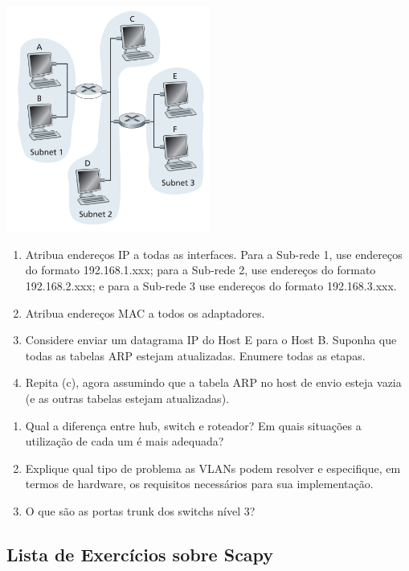 \includegraphics[width=0.5\textwidth,height=\textheight]{Figuras/fig3.png}

\begin{enumerate}
\def\labelenumi{\alph{enumi}.}
\tightlist
\item
  Atribua endereços IP a todas as interfaces. Para a Sub-rede 1, use
  endereços do formato 192.168.1.xxx; para a Sub-rede 2, use endereços
  do formato 192.168.2.xxx; e para a Sub-rede 3 use endereços do formato
  192.168.3.xxx.
\item
  Atribua endereços MAC a todos os adaptadores.
\item
  Considere enviar um datagrama IP do Host E para o Host B. Suponha que
  todas as tabelas ARP estejam atualizadas. Enumere todas as etapas.
\item
  Repita (c), agora assumindo que a tabela ARP no host de envio esteja
  vazia (e as outras tabelas estejam atualizadas).
\end{enumerate}

\begin{enumerate}
\def\labelenumi{\arabic{enumi}.}
\setcounter{enumi}{7}
\item
  Qual a diferença entre hub, switch e roteador? Em quais situações a
  utilização de cada um é mais adequada?
\item
  Explique qual tipo de problema as VLANs podem resolver e especifique,
  em termos de hardware, os requisitos necessários para sua
  implementação.
\item
  O que são as portas trunk dos switchs nível 3?
\end{enumerate}

\hypertarget{lista-de-exercuxedcios-sobre-scapy}{%
\subsection{Lista de Exercícios sobre
Scapy}\label{lista-de-exercuxedcios-sobre-scapy}}


